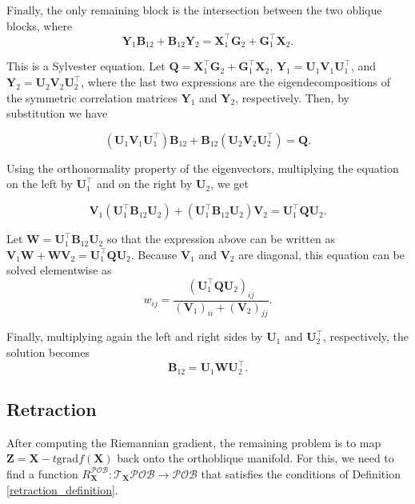 \documentclass[
  12pt,
  letterpaper,
  article]{scrartcl}
\begin{document}
Finally, the only remaining block is the intersection between the two
oblique blocks, where \[
\mathbf{Y}_1\mathbf{B}_{12} + \mathbf{B}_{12}\mathbf{Y}_2 = \mathbf{X}_1^\top\mathbf{G}_2 + \mathbf{G}_1^\top\mathbf{X}_2.
\]

This is a Sylvester equation. Let
\(\mathbf{Q} = \mathbf{X}_1^\top\mathbf{G}_2 + \mathbf{G}_1^\top\mathbf{X}_2\),
\(\mathbf{Y}_1 = \mathbf{U}_1\mathbf{V}_1\mathbf{U}_1^\top\), and
\(\mathbf{Y}_2 = \mathbf{U}_2\mathbf{V}_2\mathbf{U}_2^\top\), where the
last two expressions are the eigendecompositions of the symmetric
correlation matrices \(\mathbf{Y}_1\) and \(\mathbf{Y}_2\),
respectively. Then, by substitution we have

\[
(\mathbf{U}_1\mathbf{V}_1\mathbf{U}_1^\top)\mathbf{B}_{12} + \mathbf{B}_{12}(\mathbf{U}_2\mathbf{V}_2\mathbf{U}_2^\top) = \mathbf{Q}.
\]

Using the orthonormality property of the eigenvectors, multiplying the
equation on the left by \(\mathbf{U}_1^\top\) and on the right by
\(\mathbf{U}_2\), we get

\[
\mathbf{V}_1(\mathbf{U}_1^\top \mathbf{B}_{12}\mathbf{U}_2) + (\mathbf{U}_1^\top \mathbf{B}_{12}\mathbf{U}_2)\mathbf{V}_2 = \mathbf{U}_1^\top \mathbf{Q}\mathbf{U}_2.
\]

Let \(\mathbf{W} = \mathbf{U}_1^\top \mathbf{B}_{12}\mathbf{U}_2\) so
that the expression above can be written as
\(\mathbf{V}_1\mathbf{W} + \mathbf{W}\mathbf{V}_2 = \mathbf{U}_1^\top \mathbf{Q}\mathbf{U}_2\).
Because \(\mathbf{V}_1\) and \(\mathbf{V}_2\) are diagonal, this
equation can be solved elementwise as \[
w_{ij} = \frac{(\mathbf{U}_1^\top \mathbf{Q}\mathbf{U}_2)_{ij}}{(\mathbf{V}_1)_{ii}+(\mathbf{V}_2)_{jj}}.
\]

Finally, multiplying again the left and right sides by \(\mathbf{U}_1\)
and \(\mathbf{U}_2^\top\), respectively, the solution becomes \[
\mathbf{B}_{12} = \mathbf{U}_1\mathbf{W}\mathbf{U}_2^\top.
\]

\subsection{Retraction}\label{retraction}

After computing the Riemannian gradient, the remaining problem is to map
\(\mathbf{Z} = \mathbf{X} - t\mathrm{grad}f(\mathbf{X})\) back onto the
orthoblique manifold. For this, we need to find a function
\(R_{\mathbf{X}}^{\mathcal{POB}}: \mathcal{T}_{\mathbf{X}}\mathcal{POB} \rightarrow \mathcal{POB}\)
that satisfies the conditions of Definition \ref{retraction_definition}.
\end{document}
